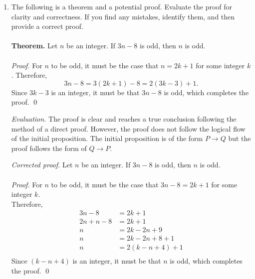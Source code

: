\documentclass[12pt]{article}
\begin{document}
\begin{enumerate}
\item The following is a theorem and a potential proof. Evaluate the proof for clarity and correctness. If you find any mistakes, identify them, and then provide a correct proof.\\\\
\textbf{Theorem.} Let $n$ be an integer. If $3n - 8$ is odd, then $n$ is odd.\\\\
\emph{Proof.} For $n$ to be odd, it must be the case that $n = 2k + 1$ for some integer $k$. Therefore,
\[3n - 8 = 3 (2k + 1) - 8 = 2 (3k - 3) + 1.\]
Since $3k - 3$ is an integer, it must be that $3n - 8$ is odd, which completes the proof. \qed

{\it Evaluation.}  The proof is clear and reaches a true conclusion following the method of a direct proof. However, the proof does not follow the logical flow of the initial proposition. The initial proposition is of the form $P \rightarrow Q$ but the proof follows the form of $Q \rightarrow P$.  

{\it Corrected proof.} Let $n$ be an integer. If $3n - 8$ is odd, then $n$ is odd.\\\\
\emph{Proof.} For $n$ to be odd, it must be the case that $3n - 8 = 2k + 1$ for some integer $k$. \\

Therefore,
\begin{align*}
        3n - 8 &= 2k + 1\\
    2n + n - 8 &= 2k + 1\\
            n &= 2k - 2n + 9\\
            n &= 2k - 2n + 8 + 1\\
            n &= 2(k - n + 4) + 1\\
\end{align*}
Since $(k - n + 4)$ is an integer, it must be that $n$ is odd, which completes the proof. \qed





\end{enumerate}
\end{document}
